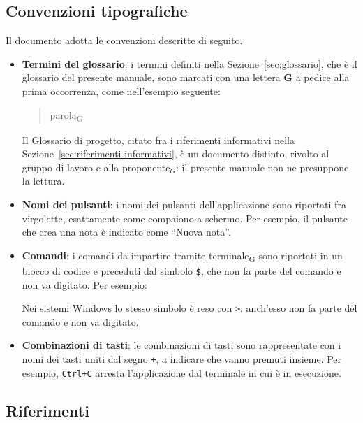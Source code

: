 \documentclass[a4paper, 10pt]{article}
\begin{document}
\subsection{Convenzioni tipografiche}
\label{sec:convenzioni-tipografiche}
Il documento adotta le convenzioni descritte di seguito.

\begin{itemize}
    \item \textbf{Termini del glossario}: i termini definiti nella Sezione~\ref{sec:glossario}, che è il glossario del presente manuale, sono marcati con una lettera \textbf{G} a pedice alla prima occorrenza, come nell'esempio seguente:

    \begin{quote}
        parola\textsubscript{G}
    \end{quote}

    Il Glossario di progetto, citato fra i riferimenti informativi nella Sezione~\ref{sec:riferimenti-informativi}, è un documento distinto, rivolto al gruppo di lavoro e alla proponente$_G$: il presente manuale non ne presuppone la lettura.

    \item \textbf{Nomi dei pulsanti}: i nomi dei pulsanti dell'applicazione sono riportati fra virgolette, esattamente come compaiono a schermo. Per esempio, il pulsante che crea una nota è indicato come ``Nuova nota''.

    \item \textbf{Comandi}: i comandi da impartire tramite terminale\textsubscript{G} sono riportati in un blocco di codice e preceduti dal simbolo \texttt{\$}, che non fa parte del comando e non va digitato. Per esempio:


    Nei sistemi Windows lo stesso simbolo è reso con \texttt{>}: anch'esso non fa parte del comando e non va digitato.

    \item \textbf{Combinazioni di tasti}: le combinazioni di tasti sono rappresentate con i nomi dei tasti uniti dal segno \texttt{+}, a indicare che vanno premuti insieme. Per esempio, \texttt{Ctrl+C} arresta l'applicazione dal terminale in cui è in esecuzione.
\end{itemize}

\subsection{Riferimenti}
\label{sec:riferimenti}
\end{document}
